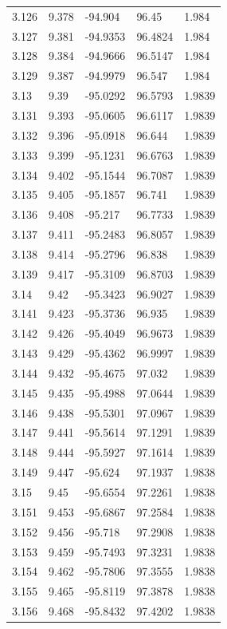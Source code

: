 \begin{tabular}{lllll}
3.126 & 9.378 & -94.904 & 96.45 & 1.984 \\
3.127 & 9.381 & -94.9353 & 96.4824 & 1.984 \\
3.128 & 9.384 & -94.9666 & 96.5147 & 1.984 \\
3.129 & 9.387 & -94.9979 & 96.547 & 1.984 \\
3.13 & 9.39 & -95.0292 & 96.5793 & 1.9839 \\
3.131 & 9.393 & -95.0605 & 96.6117 & 1.9839 \\
3.132 & 9.396 & -95.0918 & 96.644 & 1.9839 \\
3.133 & 9.399 & -95.1231 & 96.6763 & 1.9839 \\
3.134 & 9.402 & -95.1544 & 96.7087 & 1.9839 \\
3.135 & 9.405 & -95.1857 & 96.741 & 1.9839 \\
3.136 & 9.408 & -95.217 & 96.7733 & 1.9839 \\
3.137 & 9.411 & -95.2483 & 96.8057 & 1.9839 \\
3.138 & 9.414 & -95.2796 & 96.838 & 1.9839 \\
3.139 & 9.417 & -95.3109 & 96.8703 & 1.9839 \\
3.14 & 9.42 & -95.3423 & 96.9027 & 1.9839 \\
3.141 & 9.423 & -95.3736 & 96.935 & 1.9839 \\
3.142 & 9.426 & -95.4049 & 96.9673 & 1.9839 \\
3.143 & 9.429 & -95.4362 & 96.9997 & 1.9839 \\
3.144 & 9.432 & -95.4675 & 97.032 & 1.9839 \\
3.145 & 9.435 & -95.4988 & 97.0644 & 1.9839 \\
3.146 & 9.438 & -95.5301 & 97.0967 & 1.9839 \\
3.147 & 9.441 & -95.5614 & 97.1291 & 1.9839 \\
3.148 & 9.444 & -95.5927 & 97.1614 & 1.9839 \\
3.149 & 9.447 & -95.624 & 97.1937 & 1.9838 \\
3.15 & 9.45 & -95.6554 & 97.2261 & 1.9838 \\
3.151 & 9.453 & -95.6867 & 97.2584 & 1.9838 \\
3.152 & 9.456 & -95.718 & 97.2908 & 1.9838 \\
3.153 & 9.459 & -95.7493 & 97.3231 & 1.9838 \\
3.154 & 9.462 & -95.7806 & 97.3555 & 1.9838 \\
3.155 & 9.465 & -95.8119 & 97.3878 & 1.9838 \\
3.156 & 9.468 & -95.8432 & 97.4202 & 1.9838 \\

\end{tabular}
